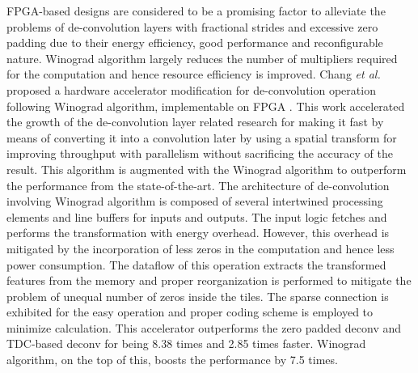 \documentclass[journal]{IEEEtran}
\begin{document}
\par FPGA-based designs are considered to be a promising factor to alleviate the problems of de-convolution layers with fractional strides and excessive zero padding due to their energy efficiency, good performance and reconfigurable nature. Winograd algorithm largely reduces the number of multipliers required for the computation and hence resource efficiency is improved. Chang \textit{et al.} proposed a hardware accelerator modification for de-convolution operation following Winograd algorithm, implementable on FPGA \cite{paper41}. This work accelerated the growth of the de-convolution layer related research for making it fast by means of converting it into a convolution later by using a spatial transform for improving throughput with parallelism without sacrificing the accuracy of the result. This algorithm is augmented with the Winograd algorithm to outperform the performance from the state-of-the-art. The architecture of de-convolution involving Winograd algorithm is composed of several intertwined processing elements and line buffers for inputs and outputs. The input logic fetches and performs the transformation with energy overhead. However, this overhead is mitigated by the incorporation of less zeros in the computation and hence less power consumption. The dataflow of this operation extracts the transformed features from the memory and proper reorganization is performed to mitigate the problem of unequal number of zeros inside the tiles. The sparse connection is exhibited for the easy operation and proper coding scheme is employed to minimize calculation. This accelerator outperforms the zero padded deconv and TDC-based deconv for being 8.38 times and 2.85 times faster. Winograd algorithm, on the top of this, boosts the performance by 7.5 times.  
\end{document}

